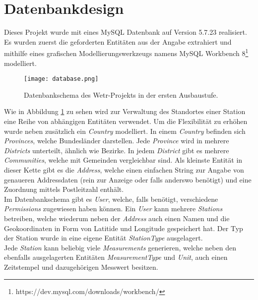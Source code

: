 \section{Datenbankdesign}

Dieses Projekt wurde mit eines MySQL Datenbank auf Version 5.7.23 realisiert. Es wurden zuerst die geforderten Entitäten aus der Angabe extrahiert und mithilfe eines grafischen Modellierungswerkzeugs namens MySQL Workbench 8\footnote{https://dev.mysql.com/downloads/workbench/} modelliert.

\begin{figure}[H]
\centering
\texttt{[image: database.png]}
\caption{Datenbankschema des Wetr-Projekts in der ersten Ausbaustufe.}
\label{fig:db}
\end{figure}

Wie in Abbildung \ref{fig:db} zu sehen wird zur Verwaltung des Standortes einer Station eine Reihe von abhängigen Entitäten verwendet. Um die Flexibilität zu erhöhen wurde neben zusätzlich ein \textit{Country} modelliert. In einem \textit{Country} befinden sich \textit{Provinces}, welche Bundesländer darstellen. Jede \textit{Province} wird in mehrere \textit{Districts} unterteilt, ähnlich wie Bezirke. In jedem \textit{District} gibt es mehrere \textit{Communities}, welche mit Gemeinden vergleichbar sind. Als kleinste Entität in dieser Kette gibt es die \textit{Address}, welche einen einfachen String zur Angabe von genaueren Addressdaten (rein zur Anzeige oder falls anderswo benötigt) und eine Zuordnung mittels Postleitzahl enthält.\\
Im Datenbankschema gibt es \textit{User}, welche, falls benötigt, verschiedene \textit{Permissions} zugewiesen haben können. Ein \textit{User} kann mehrere \textit{Stations} betreiben, welche wiederum neben der \textit{Address} auch einen Namen und die Geokoordinaten in Form von Latitide und Longitude gespeichert hat. Der Typ der Station wurde in eine eigene Entität \textit{StationType} ausgelagert.\\
Jede \textit{Station} kann beliebig viele \textit{Measurements} generieren, welche neben den ebenfalls ausgelagerten Entitäten \textit{MeasurementType} und \textit{Unit}, auch einen Zeitstempel und dazugehörigen Messwert besitzen.\\

